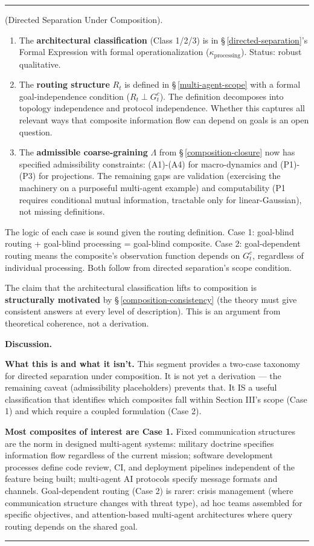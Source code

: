 \documentclass[11pt,oneside]{article}
\newcounter{claim}[section]
\renewcommand{\theclaim}{\thesection.\arabic{claim}}
\newenvironment{segment}[2]{%
  \refstepcounter{claim}%
  \bigskip\noindent\hrule\smallskip
  \noindent{\bfseries #1~\theclaim}\enskip(#2).\par\smallskip
  \noindent\ignorespaces
}{%
  \par\smallskip\noindent\hrule\bigskip
}
\newenvironment{hypothesis}[1][]{\begin{segment}{Hypothesis}{#1}}{\end{segment}}
\begin{document}
\begin{hypothesis}[Directed Separation Under Composition]
\begin{enumerate}
  \item The \textbf{architectural classification} (Class 1/2/3) is in \S\,\ref{directed-separation}'s Formal Expression with formal operationalization ($\kappa_{\text{processing}}$). Status: robust qualitative.
  \item The \textbf{routing structure} $R_t$ is defined in \S\,\ref{multi-agent-scope} with a formal goal-independence condition ($R_t \perp G_t^c$). The definition decomposes into topology independence and protocol independence. Whether this captures all relevant ways that composite information flow can depend on goals is an open question.
  \item The \textbf{admissible coarse-graining} $\Lambda$ from \S\,\ref{composition-closure} now has specified admissibility constraints: (A1)-(A4) for macro-dynamics and (P1)-(P3) for projections. The remaining gaps are validation (exercising the machinery on a purposeful multi-agent example) and computability (P1 requires conditional mutual information, tractable only for linear-Gaussian), not missing definitions.
\end{enumerate}


The logic of each case is sound given the routing definition. Case 1: goal-blind routing + goal-blind processing = goal-blind composite. Case 2: goal-dependent routing means the composite's observation function depends on $G_t^c$, regardless of individual processing. Both follow from directed separation's scope condition.

The claim that the architectural classification lifts to composition is \textbf{structurally motivated} by \S\,\ref{composition-consistency} (the theory must give consistent answers at every level of description). This is an argument from theoretical coherence, not a derivation.


\medskip\noindent\textbf{Discussion.}


\textbf{What this is and what it isn't.} This segment provides a two-case taxonomy for directed separation under composition. It is not yet a derivation — the remaining caveat (admissibility placeholders) prevents that. It IS a useful classification that identifies which composites fall within Section III's scope (Case 1) and which require a coupled formulation (Case 2).

\textbf{Most composites of interest are Case 1.} Fixed communication structures are the norm in designed multi-agent systems: military doctrine specifies information flow regardless of the current mission; software development processes define code review, CI, and deployment pipelines independent of the feature being built; multi-agent AI protocols specify message formats and channels. Goal-dependent routing (Case 2) is rarer: crisis management (where communication structure changes with threat type), ad hoc teams assembled for specific objectives, and attention-based multi-agent architectures where query routing depends on the shared goal.


\end{hypothesis}
\end{document}
